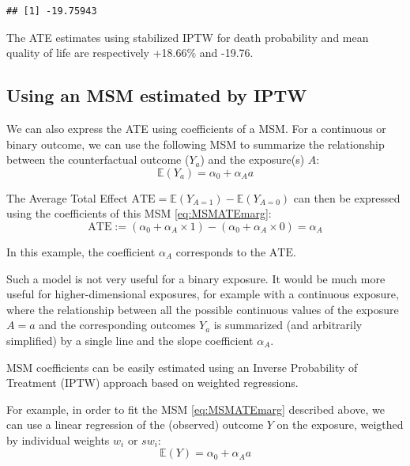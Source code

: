 \documentclass[
]{book}
\begin{document}
\begin{verbatim}
## [1] -19.75943
\end{verbatim}

The ATE estimates using stabilized IPTW for death probability and mean quality of life are respectively +18.66\% and -19.76.

\subsection{Using an MSM estimated by IPTW}\label{using-an-msm-estimated-by-iptw}

We can also express the ATE using coefficients of a MSM. For a continuous or binary outcome, we can use the following MSM to summarize the relationship between the counterfactual outcome (\(Y_a\)) and the exposure(s) \(A\):
\begin{equation} 
  \mathbb{E}(Y_a) = \alpha_0 + \alpha_A a 
  \label{eq:MSMATEmarg}
\end{equation}

The Average Total Effect \(\text{ATE} = \mathbb{E}(Y_{A=1}) - \mathbb{E}(Y_{A=0})\) can then be expressed using the coefficients of this MSM \eqref{eq:MSMATEmarg}:
\begin{equation*} 
  \text{ATE} := \left(\alpha_0 + \alpha_A \times 1 \right) - \left(\alpha_0 + \alpha_A \times 0 \right) = \alpha_A 
\end{equation*}

In this example, the coefficient \(\alpha_A\) corresponds to the \(\text{ATE}\).

Such a model is not very useful for a binary exposure. It would be much more useful for higher-dimensional exposures, for example with a continuous exposure, where the relationship between all the possible continuous values of the exposure \(A=a\) and the corresponding outcomes \(Y_a\) is summarized (and arbitrarily simplified) by a single line and the slope coefficient \(\alpha_A\).

MSM coefficients can be easily estimated using an Inverse Probability of Treatment (IPTW) approach based on weighted regressions.

For example, in order to fit the MSM \eqref{eq:MSMATEmarg} described above, we can use a linear regression of the (observed) outcome \(Y\) on the exposure, weigthed by individual weights \(w_i\) or \(sw_i\):
\begin{equation} 
  \mathbb{E}(Y) = \alpha_0 + \alpha_A a 
\end{equation}
\end{document}
